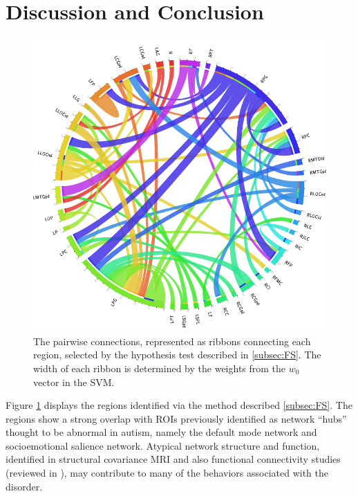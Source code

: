 \documentclass{llncs}
\begin{document}
\section{Discussion and Conclusion}
\begin{figure}
	\centering
	\includegraphics[scale = .3]{now_circos.png}
	\caption{The pairwise connections, represented as ribbons connecting each region, selected by the hypothesis test described in \ref{subsec:FS}.  The width of each ribbon is determined by the weights from the $w_0$ vector in the SVM. }
	\label{fig:circos}
\end{figure}

Figure \ref{fig:circos} displays the regions identified via the method described \ref{subsec:FS}.  The regions show a strong overlap with ROIs previously identified as network “hubs” thought to be abnormal in autism, namely the default mode network and socioemotional salience network.  Atypical network structure and function, identified in structural covariance MRI \cite{zielinski2012scmri} and also functional connectivity studies (reviewed in \cite{jeff2014}), may contribute to many of the behaviors associated with the disorder.



{}

\end{document}

